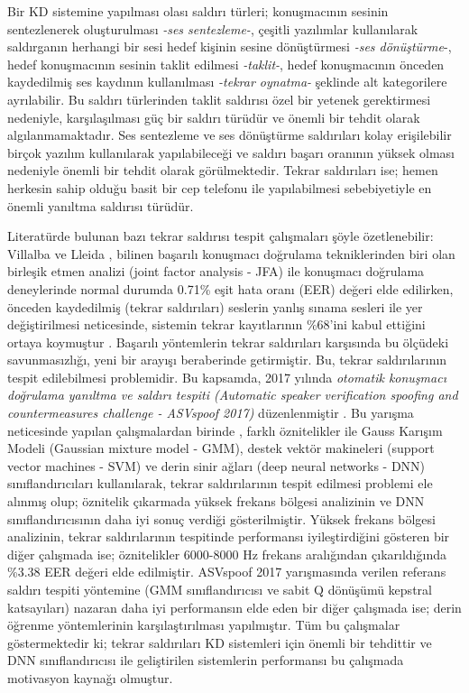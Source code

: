\documentclass[conference, a4paper]{IEEEtran}
\begin{document}
Bir KD sistemine yapılması olası saldırı türleri; konuşmacının sesinin sentezlenerek oluşturulması
\emph{-ses sentezleme-}\cite{de2012evaluation}, çeşitli yazılımlar kullanılarak saldırganın herhangi bir sesi hedef
kişinin sesine dönüştürmesi \emph{-ses dönüştürme}-\cite{stylianou2009voice}, hedef konuşmacının sesinin taklit
edilmesi \emph{-taklit-}\cite{hautamaki2015automatic}, hedef konuşmacının önceden kaydedilmiş ses kaydının kullanılması
\emph{-tekrar oynatma-} \cite{wu2015spoofing} şeklinde alt kategorilere ayrılabilir. Bu
saldırı türlerinden taklit saldırısı özel bir yetenek gerektirmesi nedeniyle, karşılaşılması güç bir saldırı türüdür
ve önemli bir tehdit olarak algılanmamaktadır. Ses sentezleme ve ses dönüştürme saldırıları kolay erişilebilir birçok
yazılım kullanılarak yapılabileceği ve saldırı başarı oranının yüksek olması nedeniyle önemli bir tehdit olarak
görülmektedir. Tekrar saldırıları ise; hemen herkesin sahip olduğu basit bir cep telefonu ile yapılabilmesi
sebebiyetiyle en önemli yanıltma saldırısı türüdür.

Literatürde bulunan bazı tekrar saldırısı tespit çalışmaları şöyle özetlenebilir: Villalba ve Lleida
\cite{villalba2010speaker}, bilinen başarılı konuşmacı doğrulama tekniklerinden biri olan birleşik etmen
analizi (joint factor analysis - JFA) ile konuşmacı doğrulama deneylerinde normal durumda 0.71\% eşit hata oranı (EER)
değeri elde edilirken, önceden kaydedilmiş (tekrar saldırıları) seslerin yanlış sınama sesleri ile yer değiştirilmesi
neticesinde, sistemin tekrar kayıtlarının \%68'ini kabul ettiğini ortaya koymuştur
\cite{villalba2010speaker}. Başarılı yöntemlerin tekrar saldırıları karşısında bu ölçüdeki savunmasızlığı,
yeni bir arayışı beraberinde getirmiştir. Bu, tekrar saldırılarının tespit edilebilmesi problemidir. Bu kapsamda, 2017
yılında \emph{otomatik konuşmacı doğrulama yanıltma ve saldırı tespiti (Automatic speaker verification spoofing and
    countermeasures challenge - ASVspoof 2017)} düzenlenmiştir \cite{kinnunen2017asvspoof}. Bu yarışma
neticesinde yapılan çalışmalardan birinde \cite{li2017study}, farklı öznitelikler ile Gauss Karışım Modeli
(Gaussian mixture model - GMM), destek vektör makineleri (support vector machines - SVM) ve derin sinir ağları (deep
neural networks - DNN) sınıflandırıcıları kullanılarak, tekrar saldırılarının tespit edilmesi problemi ele alınmış
olup; öznitelik çıkarmada yüksek frekans bölgesi analizinin ve DNN sınıflandırıcısının daha iyi sonuç verdiği
gösterilmiştir.
Yüksek frekans bölgesi analizinin, tekrar saldırılarının tespitinde performansı iyileştirdiğini gösteren bir diğer
çalışmada \cite{witkowski2017audio} ise; öznitelikler 6000-8000 Hz frekans aralığından çıkarıldığında \%3.38 EER değeri
elde edilmiştir. ASVspoof 2017 yarışmasında verilen referans saldırı tespiti yöntemine (GMM sınıflandırıcısı ve sabit
Q dönüşümü kepstral katsayıları) nazaran daha iyi performansın elde eden bir diğer çalışmada
\cite{nagarsheth2017replay} ise; derin öğrenme yöntemlerinin karşılaştırılması yapılmıştır. Tüm bu çalışmalar
göstermektedir ki; tekrar saldırıları KD sistemleri için önemli bir tehdittir ve DNN sınıflandırıcısı ile geliştirilen
sistemlerin performansı bu çalışmada motivasyon kaynağı olmuştur.
\end{document}
